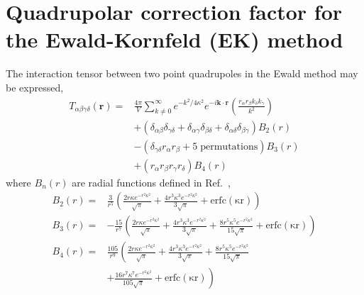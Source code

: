 \section{Quadrupolar correction factor for the Ewald-Kornfeld (EK)
  method}
The interaction tensor between two point quadrupoles in the Ewald
method may be expressed,\cite{Smith98,NeumannII83}
\begin{align}
{T}_{\alpha\beta\gamma\delta}(\mathbf{r}) = &\frac{4\pi}{V
                                              }\sum_{k\neq0}^{\infty}
                                              e^{-k^2 / 4
                                              \kappa^2} e^{-i\mathbf{k}\cdot
                                              \mathbf{r}} \left(\frac{r_\alpha r_\beta k_\delta k_\gamma}{k^2}\right)  \nonumber \\
&+ \left(\delta_{\alpha\beta}\delta_{\gamma\delta}+\delta_{\alpha\gamma}\delta_{\beta\delta}+\delta_{\alpha\delta}\delta_{\beta\gamma}\right) 
B_2(r) \nonumber \\
&- \left(\delta_{\gamma\delta} r_\alpha r_\beta +  \mathrm{ 5\; permutations}\right) B_3(r) \nonumber \\
&+ \left(r_\alpha r_\beta r_\gamma r_\delta \right)  B_4(r)
\label{ewaldTensor}
\end{align}
where $B_n(r)$ are radial functions defined in Ref.~\cite{Smith98},
\begin{align}
B_2(r)  =& \frac{3}{r^5} \left(\frac{2r\kappa e^{-r^2 \kappa^2}}{\sqrt{\pi}}+\frac{4r^3\kappa^3 e^{-r^2 \kappa^2}}{3\sqrt{\pi}}+\mathrm{erfc(\kappa r)} \right) \\
B_3(r) =& - \frac{15}{r^7}\left(\frac{2r\kappa e^{-r^2 \kappa^2}}{\sqrt{\pi}}+\frac{4r^3\kappa^3 e^{-r^2 \kappa^2}}{3\sqrt{\pi}}+\frac{8r^5\kappa^5 e^{-r^2 \kappa^2}}{15\sqrt{\pi}}+\mathrm{erfc(\kappa r)} \right) \\
B_4(r) =& \frac{105}{r^9}\left(\frac{2r\kappa e^{-r^2
          \kappa^2}}{\sqrt{\pi}}+\frac{4r^3\kappa^3 e^{-r^2 \kappa^2}}{3\sqrt{\pi}} +\frac{8r^5\kappa^5 e^{-r^2 \kappa^2}}{15\sqrt{\pi}} \right. \nonumber \\
 &+ \left. \frac{16r^7\kappa^7 e^{-r^2 \kappa^2}}{105\sqrt{\pi}} +  \mathrm{erfc(\kappa r)} \right)
\end{align}  

